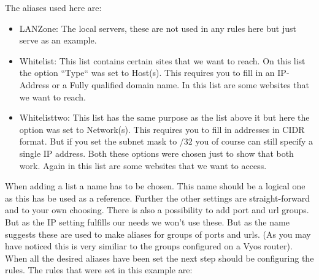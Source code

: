 The aliases used here are:
\begin{itemize}
\item LAN\textunderscore Zone: The local servers, these are not used in any rules here but just serve as an example.
\item Whitelist: This list contains certain sites that we want to reach. On this list the option ``Type`` was set to Host(s). This requires you to fill in an IP-Address or a Fully qualified domain name. In this list are some websites that we want to reach.
\item Whitelist\textunderscore two: This list has the same purpose as the list above it but here the option was set to Network(s). This requires you to fill in addresses in CIDR format. But if you set the subnet mask to /32 you of course can still specify a single IP address. Both these options were chosen just to show that both work. Again in this list are some websites that we want to access.
\end{itemize}
When adding a list a name has to be chosen. This name should be a logical one as this has be used as a reference. Further the other settings are straight-forward and to your own choosing.
There is also a possibility to add port and url groups. But as the IP setting fulfills our needs we won't use these. But as the name suggests these are used to make aliases for groups of ports and urls. (As you may have noticed this is very similiar to the groups configured on a Vyos router).
When all the desired aliases have been set the next step should be configuring the rules. The rules that were set in this example are:

